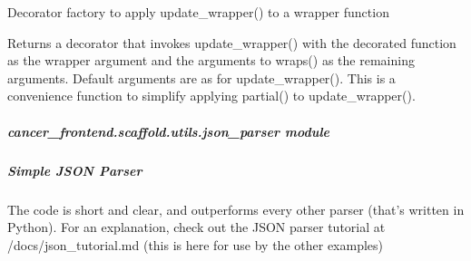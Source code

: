 \documentclass[letterpaper,10pt,english]{sphinxmanual}
\begin{document}
\begin{fulllineitems}
\label{\detokenize{cancer_frontend.scaffold.utils:cancer_frontend.scaffold.utils.import_util.wraps}}
\sphinxAtStartPar
Decorator factory to apply update\_wrapper() to a wrapper function

\sphinxAtStartPar
Returns a decorator that invokes update\_wrapper() with the decorated
function as the wrapper argument and the arguments to wraps() as the
remaining arguments. Default arguments are as for update\_wrapper().
This is a convenience function to simplify applying partial() to
update\_wrapper().

\end{fulllineitems}



\subparagraph{cancer\_frontend.scaffold.utils.json\_parser module}
\label{\detokenize{cancer_frontend.scaffold.utils:module-cancer_frontend.scaffold.utils.json_parser}}\label{\detokenize{cancer_frontend.scaffold.utils:cancer-frontend-scaffold-utils-json-parser-module}}

\subparagraph{Simple JSON Parser}
\label{\detokenize{cancer_frontend.scaffold.utils:simple-json-parser}}
\sphinxAtStartPar
The code is short and clear, and outperforms every other parser (that’s written in Python).
For an explanation, check out the JSON parser tutorial at /docs/json\_tutorial.md
(this is here for use by the other examples)
\end{document}
